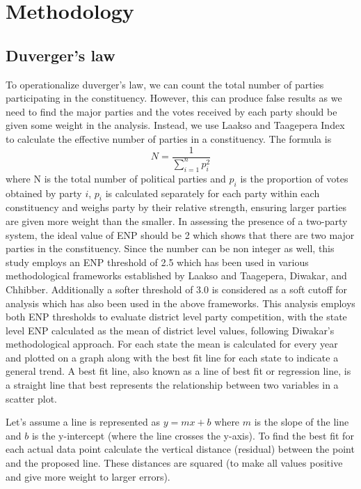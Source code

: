 \section{Methodology}
\subsection{Duverger's law}
To operationalize duverger's law, we can count the total number of parties participating in the constituency. However, this can produce false results as we need to find the major parties and the votes received by each party should be given some weight in the analysis. Instead, we use Laakso and Taagepera Index \citep{laakso1979effective} to calculate the effective number of parties in a constituency. The formula is
\begin{equation*}
N = \frac{1}{\sum_{i=1}^{n} p_i^2}
\end{equation*}
where N is the total number of political parties and $p_i$ is the proportion of votes obtained by party $i$, $p_i$ is calculated separately for each party within each constituency and weighs party by their relative strength, ensuring larger parties are given more weight than the smaller. In assessing the presence of a two-party system, the ideal value of ENP should be 2 which shows that there are two major parties in the constituency. Since the number can be non integer as well, this study employs an ENP threshold of 2.5 which has been used in various methodological frameworks established by Laakso and Taagepera, Diwakar, and Chhibber. Additionally a softer threshold of 3.0 is considered as a soft cutoff for analysis which has also been used in the above frameworks. This analysis employs both ENP thresholds to evaluate district level party competition, with the state level ENP calculated as the mean of district level values, following Diwakar's methodological approach. For each state the mean is calculated for every year and plotted on a graph along with the best fit line for each state to indicate a general trend. A best fit line, also known as a line of best fit or regression line, is a straight line that best represents the relationship between two variables in a scatter plot. 

\vspace{0.3cm}

Let's assume a line is represented as $y = mx + b$ where $m$ is the slope of the line and $b$ is the y-intercept (where the line crosses the y-axis). To find the best fit for each actual data point calculate the vertical distance (residual) between the point and the proposed line. These distances are squared (to make all values positive and give more weight to larger errors).

